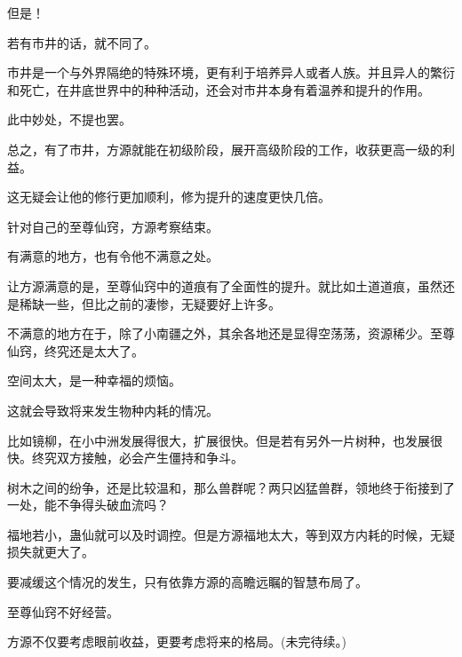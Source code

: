 \begin{this_body}
但是！

若有市井的话，就不同了。

市井是一个与外界隔绝的特殊环境，更有利于培养异人或者人族。并且异人的繁衍和死亡，在井底世界中的种种活动，还会对市井本身有着温养和提升的作用。

此中妙处，不提也罢。

总之，有了市井，方源就能在初级阶段，展开高级阶段的工作，收获更高一级的利益。

这无疑会让他的修行更加顺利，修为提升的速度更快几倍。

针对自己的至尊仙窍，方源考察结束。

有满意的地方，也有令他不满意之处。

让方源满意的是，至尊仙窍中的道痕有了全面性的提升。就比如土道道痕，虽然还是稀缺一些，但比之前的凄惨，无疑要好上许多。

不满意的地方在于，除了小南疆之外，其余各地还是显得空荡荡，资源稀少。至尊仙窍，终究还是太大了。

空间太大，是一种幸福的烦恼。

这就会导致将来发生物种内耗的情况。

比如镜柳，在小中洲发展得很大，扩展很快。但是若有另外一片树种，也发展很快。终究双方接触，必会产生僵持和争斗。

树木之间的纷争，还是比较温和，那么兽群呢？两只凶猛兽群，领地终于衔接到了一处，能不争得头破血流吗？

福地若小，蛊仙就可以及时调控。但是方源福地太大，等到双方内耗的时候，无疑损失就更大了。

要减缓这个情况的发生，只有依靠方源的高瞻远瞩的智慧布局了。

至尊仙窍不好经营。

方源不仅要考虑眼前收益，更要考虑将来的格局。(未完待续。)

\end{this_body}

